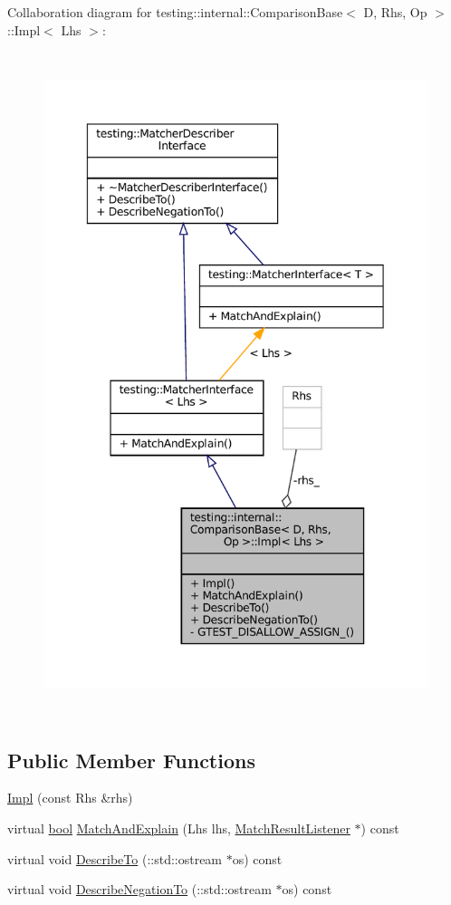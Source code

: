 Collaboration diagram for testing\+:\+:internal\+:\+:Comparison\+Base$<$ D, Rhs, Op $>$\+:\+:Impl$<$ Lhs $>$\+:
\nopagebreak
\begin{figure}[H]
\begin{center}
\leavevmode
\includegraphics[height=550pt]{classtesting_1_1internal_1_1ComparisonBase_1_1Impl__coll__graph}
\end{center}
\end{figure}
\subsection*{Public Member Functions}
\begin{DoxyCompactItemize}
\item 
\hyperlink{classtesting_1_1internal_1_1ComparisonBase_1_1Impl_ab311039db40ab8b77361666be47c5e1a}{Impl} (const Rhs \&rhs)
\item 
virtual \hyperlink{classbool}{bool} \hyperlink{classtesting_1_1internal_1_1ComparisonBase_1_1Impl_a3d4468431bc7104b8269dedfa3a596cd}{Match\+And\+Explain} (Lhs lhs, \hyperlink{classtesting_1_1MatchResultListener}{Match\+Result\+Listener} $\ast$) const
\item 
virtual void \hyperlink{classtesting_1_1internal_1_1ComparisonBase_1_1Impl_a224bdd8f8196208d8138668dc74e1d27}{Describe\+To} (\+::std\+::ostream $\ast$os) const
\item 
virtual void \hyperlink{classtesting_1_1internal_1_1ComparisonBase_1_1Impl_ab4a33d42d0941bc94e3b0051ce76bb72}{Describe\+Negation\+To} (\+::std\+::ostream $\ast$os) const
\end{DoxyCompactItemize}
